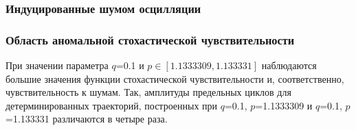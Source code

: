 \documentclass[slidestop,compress,mathserif]{beamer}
\begin{document}
\begin{frame}
\frametitle{Индуцированные шумом осцилляции}
\begin{figure}[h!]
\vspace{-1em}
\vspace{-1em}
\end{figure}
\end{frame}
\begin{frame}
\frametitle{Область аномальной стохастической чувствительности}
\vspace{2em}
При значении параметра $q$=0.1 и $p\in[1.1333309, 1.133331]$ наблюдаются большие значения функции стохастической чувствительности и, соответственно, чувствительность к шумам. Так, амплитуды предельных циклов для детерминированных траекторий, построенных при $q$=0.1, $p$=1.1333309 и $q$=0.1, $p$=1.133331 различаются в четыре раза.
\end{frame}
\end{document}
